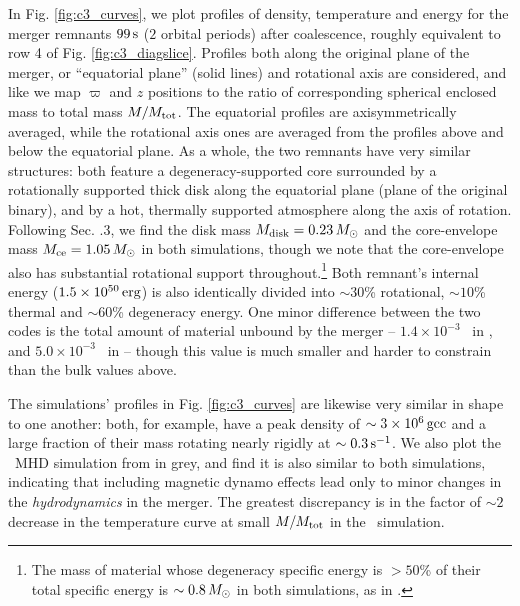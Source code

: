 In Fig. \ref{fig:c3_curves}, we plot profiles of density, temperature and energy for the merger remnants $99\,\mathrm{s}$ ($2$ orbital periods) after coalescence, roughly equivalent to row 4 of Fig. \ref{fig:c3_diagslice}.  Profiles both along the original plane of the merger, or ``equatorial plane'' (solid lines) and rotational axis are considered, and like \citeal{zhu+13} we map $\varpi$ and $z$ positions to the ratio of corresponding spherical enclosed mass to total mass $M/M_{\rm tot}$.  The equatorial profiles are axisymmetrically averaged, while the rotational axis ones are averaged from the profiles above and below the equatorial plane.  As a whole, the two remnants have very similar structures: both feature a degeneracy-supported core surrounded by a rotationally supported thick disk along the equatorial plane (plane of the original binary), and by a hot, thermally supported atmosphere along the axis of rotation.  Following \citeal{zhu+13} Sec. {.3}, we find the disk mass $\Mdisk = 0.23\,\Msun$ and the core-envelope mass $\Mrem = 1.05\,\Msun$ in both simulations, though we note that the core-envelope also has substantial rotational support throughout.\footnote{The mass of material whose degeneracy specific energy is $>50$\% of their total specific energy is $\sim0.8\,\Msun$ in both simulations, as in \cite{zhu+15}.}  Both remnant's internal energy ($1.5\times10^{50}\,\mathrm{erg}$) is also identically divided into $\sim30$\% rotational, $\sim10$\% thermal and $\sim60$\% degeneracy energy.  One minor difference between the two codes is the total amount of material unbound by the merger -- $1.4\times10^{-3}$ \Msun\ in \gasoline, and $5.0\times10^{-3}$ \Msun\ in \arepo -- though this value is much smaller and harder to constrain than the bulk values above.



The simulations' profiles in Fig. \ref{fig:c3_curves} are likewise very similar in shape to one another: both, for example, have a peak density of $\sim3\times10^6\,\mathrm{gcc}$ and a large fraction of their mass rotating nearly rigidly at $\sim0.3\,\psec$.  We also plot the \arepo\ MHD simulation from \cite{zhu+15} in grey, and find it is also similar to both simulations, indicating that including magnetic dynamo effects lead only to minor changes in the \textit{hydrodynamics} in the merger.  The greatest discrepancy is in the factor of $\sim2$ decrease in the temperature curve at small $M/M_{\rm tot}$ in the \arepo\ simulation.  

